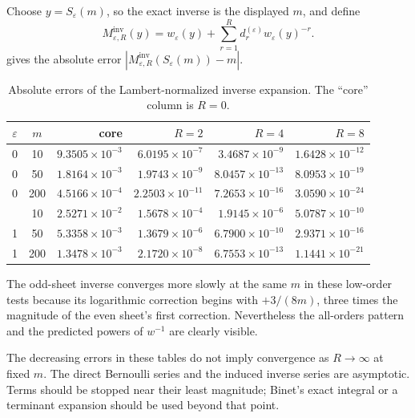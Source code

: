 \documentclass[11pt,a4paper]{article}
\theoremstyle{clean}
\theoremstyle{definition}
\newcommand{\eps}{\varepsilon}
\begin{document}
Choose \(y=S_\eps(m)\), so the exact inverse is the displayed \(m\), and define
\begin{equation}
 M_{\eps,R}^{\mathrm{inv}}(y)=w_\eps(y)+
 \sum_{r=1}^{R}d_r^{(\eps)}w_\eps(y)^{-r}.
 \label{eq:inverse-trunc}
\end{equation}
 gives the absolute error
\(\left|M_{\eps,R}^{\mathrm{inv}}(S_\eps(m))-m\right|\).

\begin{table}[htbp]
\centering
\caption{Absolute errors of the Lambert-normalized inverse expansion.  The ``core'' column is \(R=0\).}
\label{tab:inverse-errors}
\small
\begin{tabular}{@{}ccrrrr@{}}
\toprule
\(\eps\)&\(m\)&core&\(R=2\)&\(R=4\)&\(R=8\)\\
\midrule
0&10  &\(9.3505\!\times10^{-3}\)&\(6.0195\!\times10^{-7}\)&\(3.4687\!\times10^{-9}\)&\(1.6428\!\times10^{-12}\)\\
0&50  &\(1.8164\!\times10^{-3}\)&\(1.9743\!\times10^{-9}\)&\(8.0457\!\times10^{-13}\)&\(8.0953\!\times10^{-19}\)\\
0&200 &\(4.5166\!\times10^{-4}\)&\(2.2503\!\times10^{-11}\)&\(7.2653\!\times10^{-16}\)&\(3.0590\!\times10^{-24}\)\\
\addlinespace
1&10  &\(2.5271\!\times10^{-2}\)&\(1.5678\!\times10^{-4}\)&\(1.9145\!\times10^{-6}\)&\(5.0787\!\times10^{-10}\)\\
1&50  &\(5.3358\!\times10^{-3}\)&\(1.3679\!\times10^{-6}\)&\(6.7900\!\times10^{-10}\)&\(2.9371\!\times10^{-16}\)\\
1&200 &\(1.3478\!\times10^{-3}\)&\(2.1720\!\times10^{-8}\)&\(6.7553\!\times10^{-13}\)&\(1.1441\!\times10^{-21}\)\\
\bottomrule
\end{tabular}
\end{table}

The odd-sheet inverse converges more slowly at the same \(m\) in these low-order tests because its logarithmic correction begins with \(+3/(8m)\), three times the magnitude of the even sheet's first correction.  Nevertheless the all-orders pattern and the predicted powers of \(w^{-1}\) are clearly visible.

\begin{warningbox}
The decreasing errors in these tables do not imply convergence as \(R\to\infty\) at fixed \(m\).  The direct Bernoulli series and the induced inverse series are asymptotic.  Terms should be stopped near their least magnitude; Binet's exact integral or a terminant expansion should be used beyond that point.
\end{warningbox}
\end{document}
